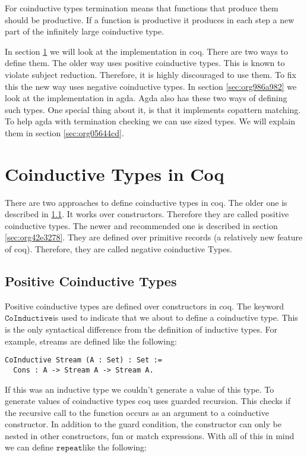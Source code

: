 \documentclass[a4paper,cleardoubleempty,BCOR1cm]{scrbook}
\begin{document}
For coinductive types termination means that functions that produce them
should be productive. If a function is productive it produces in each step a
new part of the infinitely large coinductive type.

In section \ref{sec:org4d092af} we will look at the implementation in coq.
There are two ways to define them. The older way uses positive coinductive
types. This is known to violate subject reduction. Therefore, it is highly
discouraged to use them. To fix this the new way uses negative coinductive
types. In section \ref{sec:org986a982} we look at the implementation in
agda. Agda also has these two ways of defining such types. One special thing
about it, is that it implements copattern matching. To help agda with
termination checking we can use sized types.  We will explain them in section
\ref{sec:org05644cd}.
\section{Coinductive Types in Coq}
\label{sec:org4d092af}
There are two approaches to define coinductive types in coq. The older one is
described in \ref{sec:orgdc0f923}. It works over constructors. Therefore
they are called positive coinductive types. The newer and recommended one is
described in section \ref{sec:org42e3278}. They are defined over
primitive records (a relatively new feature of coq). Therefore, they are
called negative coinductive Types.

\subsection{Positive Coinductive Types}
\label{sec:orgdc0f923}
Positive coinductive types are defined over constructors in coq.  The keyword
\linebreak $\mathtt{CoInductive}$\;is used to indicate that we about to define a coinductive type.
This is the only syntactical difference from the definition of inductive
types. For example, streams are defined like the following:

\begin{verbatim}
CoInductive Stream (A : Set) : Set :=
  Cons : A -> Stream A -> Stream A.
\end{verbatim}

If this was an inductive type we couldn't generate a value of this type. To
generate values of coinductive types coq uses guarded recursion. This checks
if the recursive call to the function occurs as an argument to a coinductive
constructor. In addition to the guard condition, the constructor can only be
nested in other constructors, fun or match expressions. With all of this in
mind we can define $\mathtt{repeat}$\;like the following:
\end{document}
